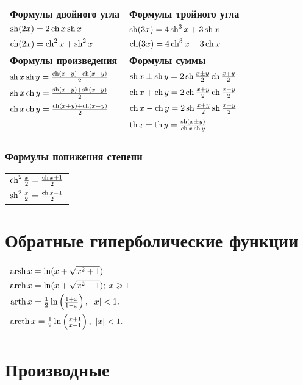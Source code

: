 \begin{longtable}[l]{l l}
{\normalfont\normalsize\bfseries Формулы двойного угла}
&
{\normalfont\normalsize\bfseries Формулы тройного угла}
\\
$\sh (2x) = 2\ch x\sh x$
&
$\sh (3x) = 4\sh^3 x + 3 \sh x$
\\
$\ch (2x) = \ch^2 x + \sh^2 x$
&
$\ch (3x) = 4 \ch^3 x - 3 \ch x$
\\
{\normalfont\normalsize\bfseries Формулы произведения}
&
{\normalfont\normalsize\bfseries Формулы суммы}
\\
$\sh x \sh y = \frac{\ch(x + y) - \ch (x - y)}{2}$
&
$\sh x \pm \sh y = 2 \sh\frac{x \pm y}{2} \ch\frac{x \mp y}{2}$
\\
$\sh x \ch y = \frac{\sh(x + y) + \sh(x - y)}{2}$
&
$\ch x + \ch y = 2 \ch\frac{x + y}{2}\ch\frac{x - y}{2}$
\\
$\ch x \ch y = \frac{\ch(x + y) + \ch(x - y)}{2}$
&
$\ch x - \ch y = 2 \sh\frac{x + y}{2}\sh\frac{x - y}{2}$
\\
&
$\th x \pm \th y = \frac{\sh(x \pm y)}{\ch x \ch y}$
\end{longtable}

\subsubsection{Формулы понижения степени}
\begin{tabular}{l}
$\ch^2 \frac{x}{2} = \frac{\ch x + 1}{2}$
\\
$\sh^2 \frac{x}{2} = \frac{\ch x - 1}{2}$
\end{tabular}

\section{Обратные гиперболические функции}

\begin{tabular}{l}
$\arsh x = \ln(x + \sqrt{x^2 + 1})$
\\
$\arch x = \ln(x + \sqrt{x^2 - 1}); \: x \ge 1$
\\
$\arth x = \frac{1}{2}\ln \left(\frac{1 + x}{1 - x} \right),\ |x|<1.$
\\
$\arcth x = \frac{1}{2}\ln \left( \frac{x+ 1}{x - 1} \right),\ |x|<1.$
\end{tabular}

\section{Производные}

